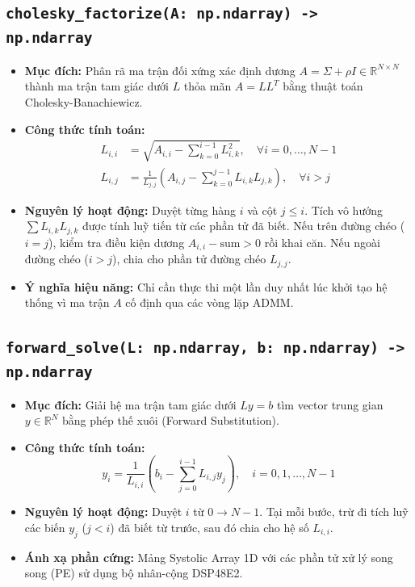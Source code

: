\documentclass[12pt,a4paper]{article}
\begin{document}
\subsection{\texttt{cholesky\_factorize(A: np.ndarray) -> np.ndarray}}
\begin{itemize}[leftmargin=1.5em]
    \item \textbf{Mục đích:} Phân rã ma trận đối xứng xác định dương $A = \Sigma + \rho I \in \mathbb{R}^{N \times N}$ thành ma trận tam giác dưới $L$ thỏa mãn $A = L L^T$ bằng thuật toán Cholesky-Banachiewicz.
    \item \textbf{Công thức tính toán:}
    \begin{align}
        L_{i,i} &= \sqrt{A_{i,i} - \sum_{k=0}^{i-1} L_{i,k}^2}, \quad \forall i = 0, \dots, N-1 \\
        L_{i,j} &= \frac{1}{L_{j,j}} \left( A_{i,j} - \sum_{k=0}^{j-1} L_{i,k} L_{j,k} \right), \quad \forall i > j
    \end{align}
    \item \textbf{Nguyên lý hoạt động:} Duyệt từng hàng $i$ và cột $j \le i$. Tích vô hướng $\sum L_{i,k} L_{j,k}$ được tính luỹ tiến từ các phần tử đã biết. Nếu trên đường chéo ($i=j$), kiểm tra điều kiện dương $A_{i,i} - \text{sum} > 0$ rồi khai căn. Nếu ngoài đường chéo ($i>j$), chia cho phần tử đường chéo $L_{j,j}$.
    \item \textbf{Ý nghĩa hiệu năng:} Chỉ cần thực thi một lần duy nhất lúc khởi tạo hệ thống vì ma trận $A$ cố định qua các vòng lặp ADMM.
\end{itemize}

\subsection{\texttt{forward\_solve(L: np.ndarray, b: np.ndarray) -> np.ndarray}}
\begin{itemize}[leftmargin=1.5em]
    \item \textbf{Mục đích:} Giải hệ ma trận tam giác dưới $L y = b$ tìm vector trung gian $y \in \mathbb{R}^N$ bằng phép thế xuôi (Forward Substitution).
    \item \textbf{Công thức tính toán:}
    \begin{equation}
        y_i = \frac{1}{L_{i,i}} \left( b_i - \sum_{j=0}^{i-1} L_{i,j} y_j \right), \quad i = 0, 1, \dots, N-1
    \end{equation}
    \item \textbf{Nguyên lý hoạt động:} Duyệt $i$ từ $0 \to N-1$. Tại mỗi bước, trừ đi tích luỹ các biến $y_j$ ($j < i$) đã biết từ trước, sau đó chia cho hệ số $L_{i,i}$.
    \item \textbf{Ánh xạ phần cứng:} Mảng Systolic Array 1D với các phần tử xử lý song song (PE) sử dụng bộ nhân-cộng DSP48E2.
\end{itemize}
\end{document}
